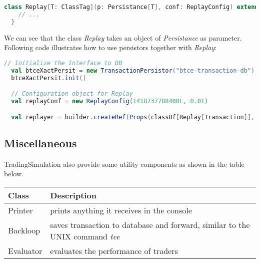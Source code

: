 \begin{lstlisting}[language=Scala]
  class Replay[T: ClassTag](p: Persistance[T], conf: ReplayConfig) extends Component {
    // ...
  }
\end{lstlisting}

We can see that the class \emph{Replay} takes an object of \emph{Persistance} as parameter. Following code illustrates how to use persistors together with \emph{Replay}:

\begin{lstlisting}[language=Scala]
  // Initialize the Interface to DB
  val btceXactPersit = new TransactionPersistor("btce-transaction-db")
  btceXactPersit.init()

  // Configuration object for Replay
  val replayConf = new ReplayConfig(1418737788400L, 0.01)

  val replayer = builder.createRef(Props(classOf[Replay[Transaction]], btceXactPersit, replayConf, implicitly[ClassTag[Transaction]]), "replayer")
\end{lstlisting}

\subsection{Miscellaneous}

TradingSimulation also provide some utility components as shown in the table below.\\

\noindent
\begin{tabularx}{\textwidth}{|l|X|}
  \hline
  Class & Description  \\
  \hline
  Printer & prints anything it receives in the console \\
  \hline
  Backloop  & saves transaction to database and forward, similar to the UNIX command \emph{tee}  \\
  \hline
  Evaluator & evaluates the performance of traders\\
  \hline
\end{tabularx}\\[0.3cm]
